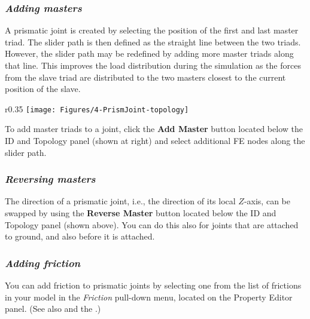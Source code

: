 \subsubsection{\sl\textbf{Adding masters}}

A prismatic joint is created by selecting the position of the first and
last master triad. The slider path is then defined as the straight line
between the two triads. However, the slider path may be redefined by
adding more master triads along that line. This improves the load distribution
during the simulation as the forces from the slave triad are distributed
to the two masters closest to the current position of the slave.

\begin{wrapfigure}[4]{r}{0.35\textwidth}
  \vspace{-8mm}
  \center
  \texttt{[image: Figures/4-PrismJoint-topology]}
\end{wrapfigure}

To add master triads to a joint, click the \textbf{Add Master} button
located below the ID and Topology panel (shown at right) and select
additional FE nodes along the slider path.

\medskip
{}

\subsubsection{\sl\textbf{Reversing masters}}

The direction of a prismatic joint, i.e., the direction of its local $Z$-axis,
can be swapped by using the \textbf{Reverse Master} button located below
the ID and Topology panel (shown above). You can do this also for joints that
are attached to ground, and also before it is attached.

\subsubsection{\sl\textbf{Adding friction}}

You can add friction to prismatic joints by selecting one from the list of
frictions in your model in the {\sl Friction} pull-down menu, located on
the Property Editor panel. (See also 
and the .)


